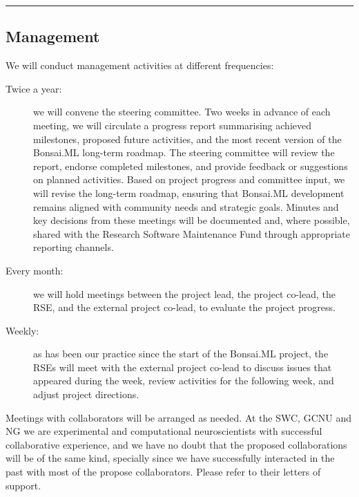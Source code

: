 \noindent\rule{\textwidth}{1pt}
\subsection{Management}

We will conduct management activities at different frequencies:

\begin{description}

    \item[Twice a year:] we will convene the steering committee. Two weeks in
        advance of each meeting, we will circulate a progress report
        summarising achieved milestones, proposed future activities, and the
        most recent version of the Bonsai.ML long-term roadmap.
        The steering committee will review the report, endorse completed
        milestones, and provide feedback or suggestions on planned activities.
        Based on project progress and committee input, we will revise the
        long-term roadmap, ensuring that Bonsai.ML development remains aligned
        with community needs and strategic goals.
        Minutes and key decisions from these meetings will be documented and,
        where possible, shared with the Research Software Maintenance Fund
        through appropriate reporting channels.

    \item[Every month:] we will hold meetings between the project lead, the
        project co-lead, the RSE, and the external project co-lead, to evaluate
        the project progress.

    \item[Weekly:] as has been our practice since the start of the Bonsai.ML
        project, the RSEs will meet with the external project co-lead to
        discuss issues that appeared during the week, review activities for the
        following week, and adjust project directions.

\end{description}

Meetings with collaborators will be arranged as needed.
%
At the SWC, GCNU and NG we are experimental and computational neuroscientists
with successful collaborative experience, and we have no doubt that the
proposed collaborations will be of the same kind,
%
specially since we have successfully interacted in the past with most of the
propose collaborators.
%
Please refer to their letters of support.
